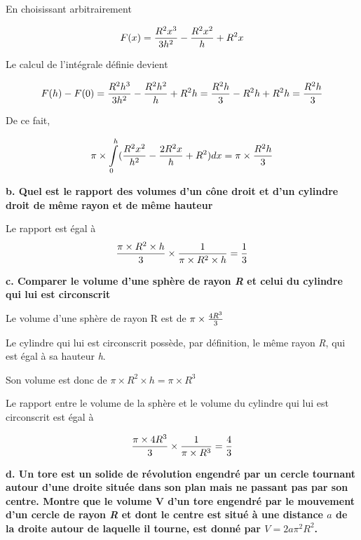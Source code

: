 \documentclass[10pt]{article}
\begin{document}
En choisissant arbitrairement

$$F(x)={R^2x^3\over{3}h^2}-{R^2x^2\over{h}}+R^2x$$\vspace{0.01cm}

Le calcul de l'intégrale définie devient\vspace{0.2cm}

$$F(h)-F(0)={R^2h^3\over{3}h^2}-{R^2h^2\over{h}}+R^2h={R^2h\over{3}}-R^2h+R^2h={R^2h\over{3}}$$\vspace{0.01cm}

De ce fait,

$$\pi\times\int\limits_0^h({R^2x^2\over{h^2}}-{2R^2x\over{h}}+R^2)dx=\pi\times{R^2h\over{3}}$$

\newpage
\flushleft \textbf{b. Quel est le rapport des volumes d'un cône droit et d'un cylindre droit de même rayon et de même hauteur}\vspace{0.5cm}

Le rapport est égal à $$\displaystyle{\pi \times R^2 \times h \over{3}} \times {1\over{\pi \times R^2 \times h}}={1\over{3}}$$

\flushleft \textbf{c. Comparer le volume d'une sphère de rayon \textit{R} et celui du cylindre qui lui est circonscrit}\vspace{0.5cm}

Le volume d'une sphère de rayon R est de $\pi\times{4R^3\over{3}}$\vspace{0.5cm}

Le cylindre qui lui est circonscrit possède, par définition, le même rayon \textit{R}, qui est égal à sa hauteur \textit{h}.\vspace{0.5cm}

Son volume est donc de $\pi \times R^2 \times h=\pi \times R^3$ \vspace{0.5cm}

Le rapport entre le volume de la sphère et le volume du cylindre qui lui est circonscrit est égal à

$$\displaystyle{\pi\times4R^3\over{3}}\times{1\over{\pi \times R^3}}={4\over{3}}$$

\flushleft \textbf{d. Un tore est un solide de révolution engendré par un cercle tournant autour d'une droite située dans son plan mais ne passant pas par son centre. Montre que le volume V d'un tore engendré par le mouvement d'un cercle de rayon \textit{R} et dont le centre est situé à une distance $a$ de la droite autour de laquelle il tourne, est donné par $V=2a\pi^2 R^2$.}\vspace{0.5cm}
\end{document}
